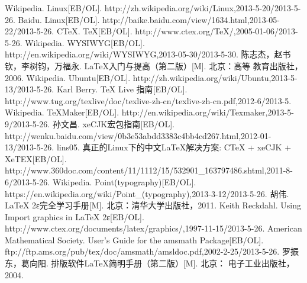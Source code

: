 \begin{thebibliography}{20}
 Wikipedia. Linux[EB/OL]. http://zh.wikipedia.org/wiki/Linux,2013-5-20/2013-5-26. 
 Baidu. Linux[EB/OL]. http://baike.baidu.com/view/1634.html,2013-05-22/2013-5-26.
 C\TeX{}. \TeX{}[EB/OL]. http://www.ctex.org/TeX/,2005-01-06/2013-5-26. 
 Wikipedia. WYSIWYG[EB/OL].\\
http://en.wikipedia.org/wiki/WYSIWYG,2013-05-30/2013-5-30.
 陈志杰，赵书钦，李树钧，万福永. \LaTeX{}入门与提高（第二版）[M]. 北京：高等 教育出版社，2006.
 Wikipedia. Ubuntu[EB/OL]. http://zh.wikipedia.org/wiki/Ubuntu,2013-5-13/2013-5-26.
 Karl Berry. \TeX{} Live 指南[EB/OL].\\
http://www.tug.org/texlive/doc/texlive-zh-cn/texlive-zh-cn.pdf,2012-6/2013-5.
 Wikipedia. \TeX{}Maker[EB/OL]. http://en.wikipedia.org/wiki/Texmaker,2013-5-9/2013-5-26.
 孙文昌. xeCJK宏包指南[EB/OL].\\
http://wenku.baidu.com/view/0b3e53abdd3383c4bb4cd267.html,2012-01-13/2013-5-26.
 lins05. 真正的Linux下的中文\LaTeX{}解决方案: CTeX + xeCJK + XeTEX[EB/OL]. \\http://www.360doc.com/content/11/1112/15/532901\_163797486.shtml,2011-8-6/2013-5-26.
 Wikipedia. Point(typography)[EB/OL]. \\
https://en.wikipedia.org/wiki/Point\_(typography),2013-3-12/2013-5-26.
 胡伟. \LaTeX{} 2ε完全学习手册[M]. 北京：清华大学出版社，2011. 
 Keith Reckdahl. Using Import graphics in \LaTeX{} 2ε[EB/OL].\\
http://www.ctex.org/documents/latex/graphics/,1997-11-15/2013-5-26.
 American Mathematical Society. User's Guide for the amsmath Package[EB/OL].\\
ftp://ftp.ams.org/pub/tex/doc/amsmath/amsldoc.pdf,2002-2-25/2013-5-26.
 罗振东，葛向阳. 排版软件\LaTeX{}简明手册（第二版）[M]. 北京： 电子工业出版社，2004.
\end{thebibliography}
